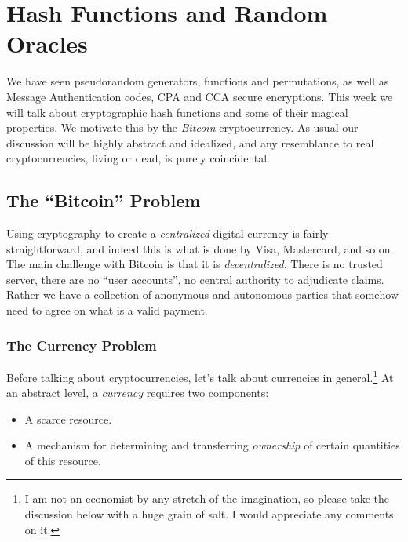 \chapter{Hash Functions and Random
Oracles}\label{Hash-Functions-and-Random-Orac}

We have seen pseudorandom generators, functions and permutations, as
well as Message Authentication codes, CPA and CCA secure encryptions.
This week we will talk about cryptographic hash functions and some of
their magical properties. We motivate this by the \emph{Bitcoin}
cryptocurrency. As usual our discussion will be highly abstract and
idealized, and any resemblance to real cryptocurrencies, living or dead,
is purely coincidental.

\section{The ``Bitcoin'' Problem}\label{The-Bitcoin-Problem}

Using cryptography to create a \emph{centralized} digital-currency is
fairly straightforward, and indeed this is what is done by Visa,
Mastercard, and so on. The main challenge with Bitcoin is that it is
\emph{decentralized}. There is no trusted server, there are no ``user
accounts'', no central authority to adjudicate claims. Rather we have a
collection of anonymous and autonomous parties that somehow need to
agree on what is a valid payment.

\subsection{The Currency Problem}\label{The-Currency-Problem}

Before talking about cryptocurrencies, let's talk about currencies in
general.\footnote{I am not an economist by any stretch of the
  imagination, so please take the discussion below with a huge grain of
  salt. I would appreciate any comments on it.} At an abstract level, a
\emph{currency} requires two components:

\begin{itemize}
\item
  A scarce resource.
\item
  A mechanism for determining and transferring \emph{ownership} of
  certain quantities of this resource.
\end{itemize}

